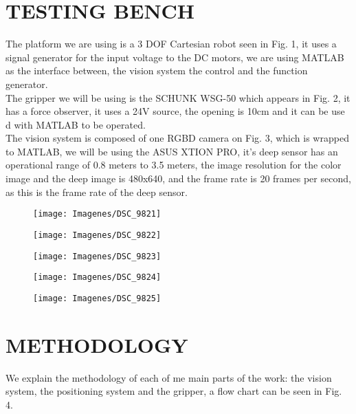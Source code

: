     \section{TESTING BENCH}
    The platform we are using is a 3 DOF Cartesian robot seen in Fig. 1, it uses a signal generator for the input voltage to the DC motors, we are using MATLAB as the interface between, the vision system the control and the function generator.\\
    The gripper we will be using is the SCHUNK WSG-50 which appears in Fig. 2, it has a force observer, it uses a 24V source, the opening is 10cm and it can be use d with MATLAB to be operated.\\
    The vision system is composed of one RGBD camera on Fig. 3, which is wrapped to MATLAB, we will be using the ASUS XTION PRO, it's deep sensor has an operational range of 0.8 meters to 3.5 meters, the image resolution for the color image and the deep image is 480x640, and the frame rate is 20 frames per second, as this is the frame rate of the deep sensor.\\
    
    
\begin{figure}
	\centering
	\texttt{[image: Imagenes/DSC\_9821]}
	\caption{}
	\label{fig:dsc9821}
\end{figure}
\begin{figure}
	\centering
	\texttt{[image: Imagenes/DSC\_9822]}
	\caption{}
	\label{fig:dsc9822}
\end{figure}
\begin{figure}
	\centering
	\texttt{[image: Imagenes/DSC\_9823]}
	\caption{}
	\label{fig:dsc9823}
\end{figure}
\begin{figure}
	\centering
	\texttt{[image: Imagenes/DSC\_9824]}
	\caption{}
	\label{fig:dsc9824}
\end{figure}
\begin{figure}
	\centering
	\texttt{[image: Imagenes/DSC\_9825]}
	\caption{}
	\label{fig:dsc9825}
\end{figure}
    
    
    \section{METHODOLOGY}
    We explain the methodology of each of me main parts of the work: the vision system, the positioning system and the gripper, a flow chart can be seen in Fig. 4.\\
